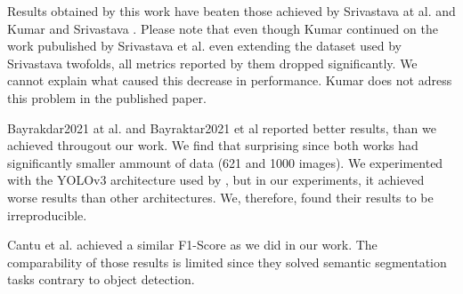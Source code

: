 Results obtained by this work have beaten those achieved by Srivastava at al. \cite{Srivastava2017} and Kumar and Srivastava \cite{Kumar}. Please note that even though Kumar continued on the work pubulished by Srivastava et al. even extending the dataset used by Srivastava twofolds, all metrics reported by them dropped significantly. We cannot explain what caused this decrease in performance. Kumar does not adress this problem in the published paper.

Bayrakdar2021 at al. \cite{Bayrakdar2021} and Bayraktar2021 et al \cite{Bayraktar2021} reported better results, than we achieved througout our work. We find that surprising since both works had significantly smaller ammount of data (621 and 1000 images). We experimented with the YOLOv3 architecture used by \cite{Bayraktar2021}, but in our experiments, it achieved worse results than other architectures. We, therefore, found their results to be irreproducible.

Cantu et al. achieved a similar F1-Score as we did in our work. The comparability of those results is limited since they solved semantic segmentation tasks contrary to object detection.
